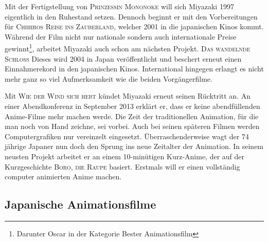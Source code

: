Mit der Fertigstellung von \textsc{Prinzessin Mononoke} will sich Miyazaki 1997 eigentlich in den Ruhestand setzen. Dennoch beginnt er mit den Vorbereitungen für \textsc{Chihiros Reise ins Zauberland}, welcher 2001 in die japanischen Kinos kommt. Während der Film nicht nur nationale sondern auch internationale Preise gewinnt\footnote{Darunter Oscar in der Kategorie Bester Animationsfilm}, arbeitet Miyazaki auch schon am nächsten Projekt. \textsc{Das wandelnde Schloss} Dieses wird 2004 in Japan veröffentlicht und beschert erneut einen Einnahmerekord in den japanischen Kinos. International hingegen erlangt es nicht mehr ganz so viel Aufmerksamkeit wie die beiden Vorgängerfilme. 

Mit \textsc{Wie der Wind sich hebt} kündet Miyazaki erneut seinen Rücktritt an. An einer Abendkonferenz in September 2013 erklärt er, dass er keine abendfüllenden Anime-Filme mehr machen werde. Die Zeit der traditionellen Animation, für die man noch von Hand zeichne, sei vorbei. Auch bei seinen späteren Filmen werden Computergrafiken nur vereinzelt eingesetzt. Überraschenderweise wagt der 74 jährige Japaner nun doch den Sprung ins neue Zeitalter der Animation. In seinem neusten Projekt arbeitet er an einem 10-minütigen Kurz-Anime, der auf der Kurzgeschichte \textsc{Boro, die Raupe} basiert. Erstmals will er einen vollständig computer animierten Anime machen. 

\subsection{Japanische Animationsfilme}
